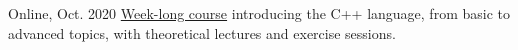 \begin{cventries}
    {}{Online, Oct. 2020}
    {\href{https://indico.cern.ch/event/946584}{Week-long course} introducing the C++ language, from basic to advanced topics, with theoretical lectures and exercise sessions.}\vspace*{2mm}
\end{cventries}